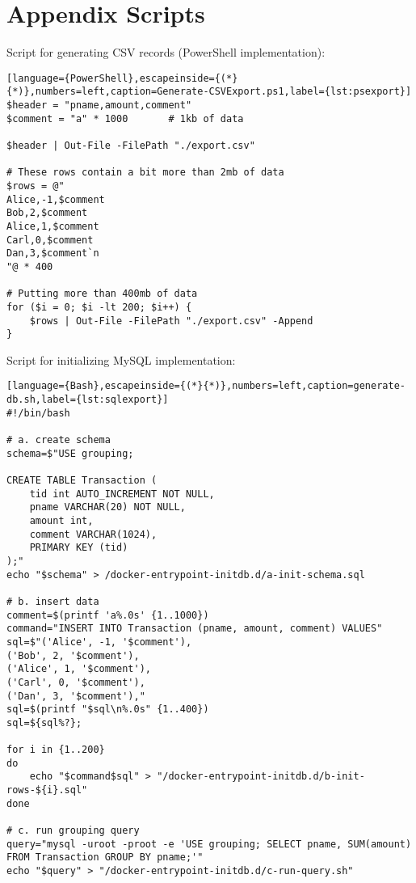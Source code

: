 \appendix
\section*{Appendix Scripts} \label{Appendix}

Script for generating CSV records (PowerShell implementation):

\begin{lstlisting}[language={PowerShell},escapeinside={(*}{*)},numbers=left,caption=Generate-CSVExport.ps1,label={lst:psexport}]
$header = "pname,amount,comment"
$comment = "a" * 1000       # 1kb of data

$header | Out-File -FilePath "./export.csv"

# These rows contain a bit more than 2mb of data
$rows = @"
Alice,-1,$comment
Bob,2,$comment
Alice,1,$comment
Carl,0,$comment
Dan,3,$comment`n
"@ * 400

# Putting more than 400mb of data
for ($i = 0; $i -lt 200; $i++) {
    $rows | Out-File -FilePath "./export.csv" -Append
}
\end{lstlisting}
Script for initializing MySQL implementation:

\begin{lstlisting}[language={Bash},escapeinside={(*}{*)},numbers=left,caption=generate-db.sh,label={lst:sqlexport}]
#!/bin/bash

# a. create schema
schema=$"USE grouping;

CREATE TABLE Transaction (
    tid int AUTO_INCREMENT NOT NULL,
    pname VARCHAR(20) NOT NULL,
    amount int,
    comment VARCHAR(1024),
    PRIMARY KEY (tid)
);"
echo "$schema" > /docker-entrypoint-initdb.d/a-init-schema.sql

# b. insert data
comment=$(printf 'a%.0s' {1..1000})
command="INSERT INTO Transaction (pname, amount, comment) VALUES"
sql=$"('Alice', -1, '$comment'),
('Bob', 2, '$comment'),
('Alice', 1, '$comment'),
('Carl', 0, '$comment'),
('Dan', 3, '$comment'),"
sql=$(printf "$sql\n%.0s" {1..400})
sql=${sql%?};       

for i in {1..200}
do
    echo "$command$sql" > "/docker-entrypoint-initdb.d/b-init-rows-${i}.sql"
done

# c. run grouping query
query="mysql -uroot -proot -e 'USE grouping; SELECT pname, SUM(amount) FROM Transaction GROUP BY pname;'"
echo "$query" > "/docker-entrypoint-initdb.d/c-run-query.sh"
\end{lstlisting}